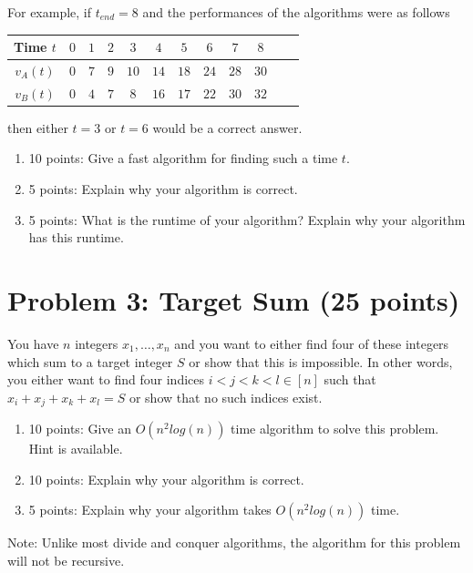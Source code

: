 \documentclass[12pt]{article}
\begin{document}
For example, if $t_{end} = 8$ and the performances of the algorithms were as follows
\begin{center}
\begin{tabular}{|c|c|c|c|c|c|c|c|c|c|c|c|}
 \hline
 Time $t$ & $0$ & $1$ & $2$ & $3$ & $4$ & $5$ & $6$ & $7$ & $8$\\
 \hline
 $v_A(t)$ & $0$ & $7$ & $9$ & $10$ & $14$ & $18$ & $24$ & $28$ & $30$\\
 \hline
 $v_B(t)$ & $0$ & $4$ & $7$ & $8$ & $16$ & $17$ & $22$ & $30$ & $32$\\
 \hline
\end{tabular}
\end{center}
then either $t = 3$ or $t = 6$ would be a correct answer.
\begin{enumerate}
\item[(a)] 10 points: Give a fast algorithm for finding such a time $t$.
\item[(b)] 5 points: Explain why your algorithm is correct. 
\item[(c)] 5 points: What is the runtime of your algorithm? Explain why your algorithm has this runtime.
\end{enumerate}
\section*{Problem 3: Target Sum (25 points)}
You have $n$ integers $x_1,\ldots,x_n$ and you want to either find four of these integers which sum to a target integer $S$ or show that this is impossible. In other words, you either want to find four indices $i < j < k < l \in [n]$ such that $x_i + x_j + x_k + x_l = S$ or show that no such indices exist.
\begin{enumerate}
\item[(a)] 10 points: Give an $O(n^2log(n))$ time algorithm to solve this problem. Hint is available.
\item[(b)] 10 points: Explain why your algorithm is correct.
\item[(c)] 5 points: Explain why your algorithm takes $O(n^2log(n))$ time.
\end{enumerate}
Note: Unlike most divide and conquer algorithms, the algorithm for this problem will not be recursive.
\end{document}
